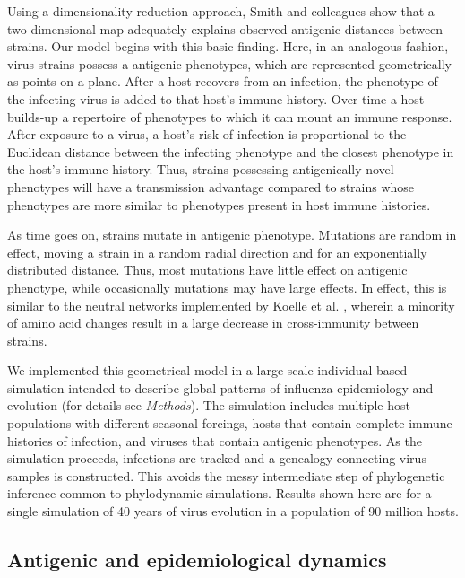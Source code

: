 \documentclass[11pt,oneside,letterpaper]{article}
\begin{document}
Using a dimensionality reduction approach, Smith and colleagues \cite{Smith04} show that a two-dimensional map adequately explains observed antigenic distances between strains.  Our model begins with this basic finding.  Here, in an analogous fashion, virus strains possess a antigenic phenotypes, which are represented geometrically as points on a plane.  After a host recovers from an infection, the phenotype of the infecting virus is added to that host's immune history.  Over time a host builds-up a repertoire of phenotypes to which it can mount an immune response.  After exposure to a virus, a host's risk of infection is proportional to the Euclidean distance between the infecting phenotype and the closest phenotype in the host's immune history.  Thus, strains possessing antigenically novel phenotypes will have a transmission advantage compared to strains whose phenotypes are more similar to phenotypes present in host immune histories.

As time goes on, strains mutate in antigenic phenotype.  Mutations are random in effect, moving a strain in a random radial direction and for an exponentially distributed distance.  Thus, most mutations have little effect on antigenic phenotype, while occasionally mutations may have large effects.  In effect, this is similar to the neutral networks implemented by Koelle et al. \cite{Koelle06}, wherein a minority of amino acid changes result in a large decrease in cross-immunity between strains.

We implemented this geometrical model in a large-scale individual-based simulation intended to describe global patterns of influenza epidemiology and evolution (for details see \textsl{Methods}).  The simulation includes multiple host populations with different seasonal forcings, hosts that contain complete immune histories of infection, and viruses that contain antigenic phenotypes.  As the simulation proceeds, infections are tracked and a genealogy connecting virus samples is constructed.  This avoids the messy intermediate step of phylogenetic inference common to phylodynamic simulations.  Results shown here are for a single simulation of 40 years of virus evolution in a population of 90 million hosts.  

\subsection*{Antigenic and epidemiological dynamics}
\end{document}
